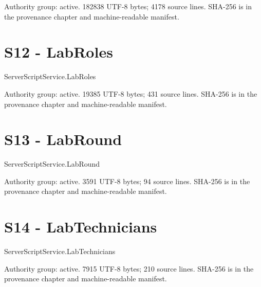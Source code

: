 Authority group: active.\allowbreak{} 182838 UTF-8 bytes; 4178 source lines.\allowbreak{} SHA-256 is in the provenance chapter and machine-readable manifest.\allowbreak{}

\begingroup{}
\endgroup
\chapter{S12 - LabRoles}
\label{src:S12}
ServerScriptService.\allowbreak{}LabRoles

Authority group: active.\allowbreak{} 19385 UTF-8 bytes; 431 source lines.\allowbreak{} SHA-256 is in the provenance chapter and machine-readable manifest.\allowbreak{}

\begingroup{}
\endgroup
\chapter{S13 - LabRound}
\label{src:S13}
ServerScriptService.\allowbreak{}LabRound

Authority group: active.\allowbreak{} 3591 UTF-8 bytes; 94 source lines.\allowbreak{} SHA-256 is in the provenance chapter and machine-readable manifest.\allowbreak{}

\begingroup{}
\endgroup
\chapter{S14 - LabTechnicians}
\label{src:S14}
ServerScriptService.\allowbreak{}LabTechnicians

Authority group: active.\allowbreak{} 7915 UTF-8 bytes; 210 source lines.\allowbreak{} SHA-256 is in the provenance chapter and machine-readable manifest.\allowbreak{}

\begingroup{}
\endgroup
